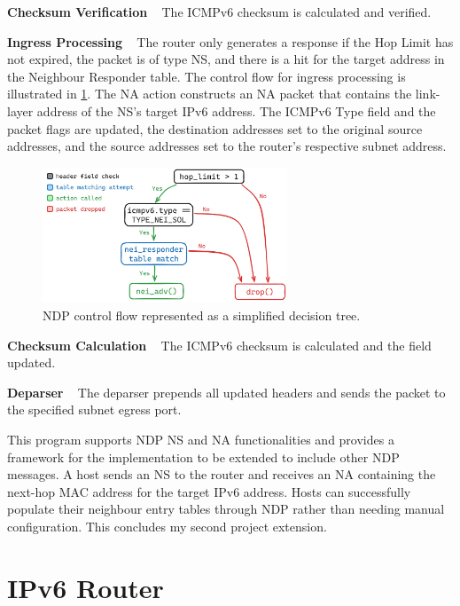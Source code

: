\textbf{Checksum Verification} ~ The ICMPv6 checksum is calculated and verified.

\textbf{Ingress Processing} ~ The router only generates a response if the Hop Limit has not expired, the packet is of type NS, and there is a hit for the target address in the Neighbour Responder table. The control flow for ingress processing is illustrated in \cref{fig:impl-ndpapply}. The NA action constructs an NA packet that contains the link-layer address of the NS's target IPv6 address. The ICMPv6 Type field and the packet flags are updated, the destination addresses set to the original source addresses, and the source addresses set to the router’s respective subnet address. 

\begin{figure}[htbp]
  \centering
    \includegraphics[width=0.65\textwidth]{figures/implementation/ndp_apply.jpg}
     \caption{NDP control flow represented as a simplified decision tree.}
     \label{fig:impl-ndpapply}
\end{figure}

\textbf{Checksum Calculation} ~ The ICMPv6 checksum is calculated and the field updated. 

\textbf{Deparser} ~ The deparser prepends all updated headers and sends the packet to the specified subnet egress port.

This program supports NDP NS and NA functionalities and provides a framework for the implementation to be extended to include other NDP messages. A host sends an NS to the router and receives an NA containing the next-hop MAC address for the target IPv6 address. Hosts can successfully populate their neighbour entry tables through NDP rather than needing manual configuration. This concludes my second project extension.



\section{IPv6 Router}
\label{sec:3.7}

